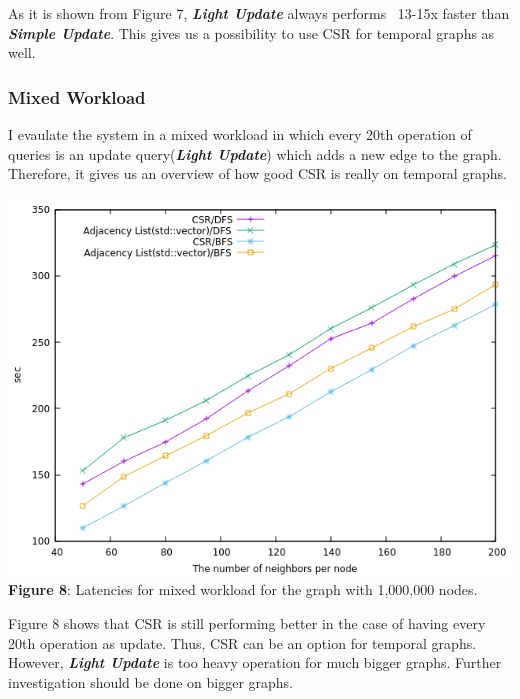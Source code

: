 \documentclass{article}
\begin{document}
 As it is shown from Figure 7, \textbf{\textit{Light Update}} always performs ~13-15x faster than \textbf{\textit{Simple Update}}. This gives us a possibility to use CSR for temporal graphs as well.
 
 \subsubsection*{Mixed Workload}
 I evaulate the system in a mixed workload in which every 20th operation of queries is an update query(\textbf{\textit{Light Update}}) which adds a new edge to the graph. Therefore, it gives us an overview of how good CSR is really on temporal graphs.
 \begin{center}
\includegraphics[scale = 0.5]{mixed_workload}\\
\textbf{Figure 8}: Latencies for mixed workload for the graph with 1,000,000 nodes.
\end{center}
 Figure 8 shows that CSR is still performing better in the case of having every 20th operation as update. Thus, CSR can be an option for temporal graphs. However, \textbf{\textit{Light Update}} is too heavy operation for much bigger graphs. Further investigation should be done on bigger graphs.
\end{document}
